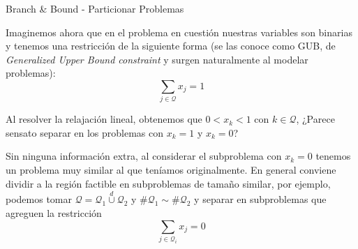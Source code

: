 \documentclass[10pt, aspectratio=169]{beamer}
\begin{document}
\begin{frame}{Branch \& Bound - Particionar Problemas}
	
	Imaginemos ahora que en el problema en cuesti\'on nuestras variables son binarias y tenemos una restricci\'on de la siguiente forma (se las conoce como GUB, de \textsl{Generalized Upper Bound constraint} y surgen naturalmente al modelar problemas):
	$$ \sum\limits_{j \in \mathcal{Q}} x_j = 1 $$
	
	Al resolver la relajaci\'on lineal, obtenemos que $0 < x_k < 1$ con $k \in \mathcal{Q}$, ¿Parece sensato separar en los problemas con $x_k = 1$ y $x_k = 0$?
	
	\pause
	
	Sin ninguna informaci\'on extra, al considerar el subproblema con $x_k = 0$ tenemos un problema muy similar al que ten\'iamos originalmente. En general conviene dividir a la regi\'on factible en subproblemas de tamaño similar, por ejemplo, podemos tomar $\mathcal{Q} = \mathcal{Q}_1 \overset{d}{\cup} \mathcal{Q}_2$ y $\# \mathcal{Q}_1 \sim \# \mathcal{Q}_2$ y separar en subproblemas que agreguen la restricci\'on 	$$ \sum\limits_{j \in \mathcal{Q}_i} x_j = 0 $$
	
\end{frame}

	
	
	

	
\end{document}
